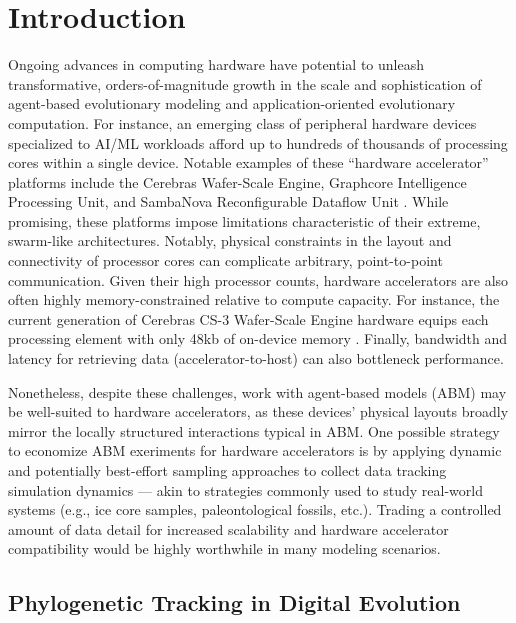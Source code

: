 \section{Introduction} \label{sec:introduction}

Ongoing advances in computing hardware have potential to unleash transformative, orders-of-magnitude growth in the scale and sophistication of agent-based evolutionary modeling and application-oriented evolutionary computation.
For instance, an emerging class of peripheral hardware devices specialized to AI/ML workloads afford up to hundreds of thousands of processing cores within a single device.
Notable examples of these ``hardware accelerator'' platforms include the Cerebras Wafer-Scale Engine, Graphcore Intelligence Processing Unit, and SambaNova Reconfigurable Dataflow Unit \citep{lauterbach2021path,jia2019dissecting,emani2021accelerating}.
While promising, these platforms impose limitations characteristic of their extreme, swarm-like architectures.
Notably, physical constraints in the layout and connectivity of processor cores can complicate arbitrary, point-to-point communication.
Given their high processor counts, hardware accelerators are also often highly memory-constrained relative to compute capacity.
For instance, the current generation of Cerebras CS-3 Wafer-Scale Engine hardware equips each processing element with only 48kb of on-device memory \citep{fenner2024news}.
Finally, bandwidth and latency for retrieving data (accelerator-to-host) can also bottleneck performance.

Nonetheless, despite these challenges, work with agent-based models (ABM) may be well-suited to hardware accelerators, as these devices' physical layouts broadly mirror the locally structured interactions typical in ABM.
One possible strategy to economize ABM exeriments for hardware accelerators is by applying dynamic and potentially best-effort sampling approaches to collect data tracking simulation dynamics --- akin to strategies commonly used to study real-world systems (e.g., ice core samples, paleontological fossils, etc.).
Trading a controlled amount of data detail for increased scalability and hardware accelerator compatibility would be highly worthwhile in many modeling scenarios.

\subsection{Phylogenetic Tracking in Digital Evolution}

